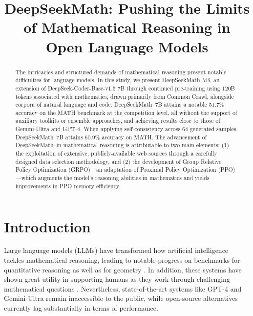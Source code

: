 \title{DeepSeekMath: Pushing the Limits of Mathematical Reasoning in Open Language Models}

\begin{abstract}
The intricacies and structured demands of mathematical reasoning present notable difficulties for language models. In this study, we present DeepSeekMath~7B, an extension of DeepSeek-Coder-Base-v1.5 7B through continued pre-training using 120B tokens associated with mathematics, drawn primarily from Common Crawl, alongside corpora of natural language and code. DeepSeekMath~7B attains a notable 51.7\% accuracy on the MATH benchmark at the competition level, all without the support of auxiliary toolkits or ensemble approaches, and achieving results close to those of Gemini-Ultra and GPT-4. When applying self-consistency across 64 generated samples, DeepSeekMath~7B attains 60.9\% accuracy on MATH. The advancement of DeepSeekMath~in mathematical reasoning is attributable to two main elements: (1) the exploitation of extensive, publicly-available web sources through a carefully designed data selection methodology, and (2) the development of Group Relative Policy Optimization (GRPO)—an adaptation of Proximal Policy Optimization (PPO)—which augments the model’s reasoning abilities in mathematics and yields improvements in PPO memory efficiency.
\end{abstract}

\section{Introduction}

Large language models (LLMs) have transformed how artificial intelligence tackles mathematical reasoning, leading to notable progress on benchmarks for quantitative reasoning \citep{MATH} as well as for geometry \citep{trinh2024solving}. In addition, these systems have shown great utility in supporting humans as they work through challenging mathematical questions \citep{tao}. Nevertheless, state-of-the-art systems like GPT-4 \citep{gpt4} and Gemini-Ultra \citep{gemini} remain inaccessible to the public, while open-source alternatives currently lag substantially in terms of performance.

